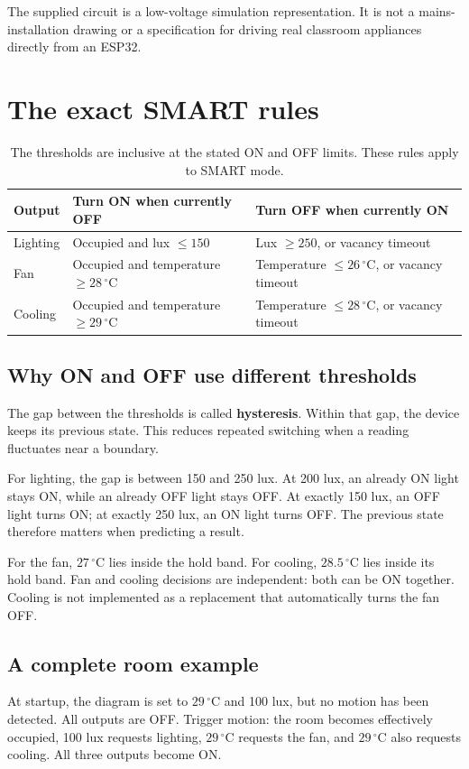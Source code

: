 \documentclass[11pt,a4paper]{article}
\newcommand{\temp}[1]{\ensuremath{#1\,^{\circ}\mathrm{C}}}
\begin{document}
The supplied circuit is a low-voltage simulation representation. It is
not a mains-installation drawing or a specification for driving real
classroom appliances directly from an ESP32.

\section{The exact SMART rules}
\label{sec:rules}
\begin{table}[htbp]
\centering
\begin{tabularx}{\textwidth}{@{}l Y Y@{}}
\toprule
Output & Turn ON when currently OFF & Turn OFF when currently ON \\
\midrule
Lighting & Occupied and lux \(\leq 150\) & Lux \(\geq 250\), or vacancy timeout \\
Fan & Occupied and temperature \(\geq\temp{28}\) & Temperature \(\leq\temp{26}\), or vacancy timeout \\
Cooling & Occupied and temperature \(\geq\temp{29}\) & Temperature \(\leq\temp{28}\), or vacancy timeout \\
\bottomrule
\end{tabularx}
\caption{The thresholds are inclusive at the stated ON and OFF limits.
These rules apply to SMART mode.}
\end{table}

\subsection{Why ON and OFF use different thresholds}
The gap between the thresholds is called \textbf{hysteresis}. Within
that gap, the device keeps its previous state. This reduces repeated
switching when a reading fluctuates near a boundary.

For lighting, the gap is between 150 and 250 lux. At 200 lux, an already
ON light stays ON, while an already OFF light stays OFF. At exactly
150 lux, an OFF light turns ON; at exactly 250 lux, an ON light turns
OFF. The previous state therefore matters when predicting a result.

For the fan, \temp{27} lies inside the hold band. For cooling,
\temp{28.5} lies inside its hold band. Fan and cooling decisions are
independent: both can be ON together. Cooling is not implemented as a
replacement that automatically turns the fan OFF.

\subsection{A complete room example}
At startup, the diagram is set to \temp{29} and 100 lux, but no motion
has been detected. All outputs are OFF. Trigger motion: the room becomes
effectively occupied, 100 lux requests lighting, \temp{29} requests the
fan, and \temp{29} also requests cooling. All three outputs become ON.
\end{document}
